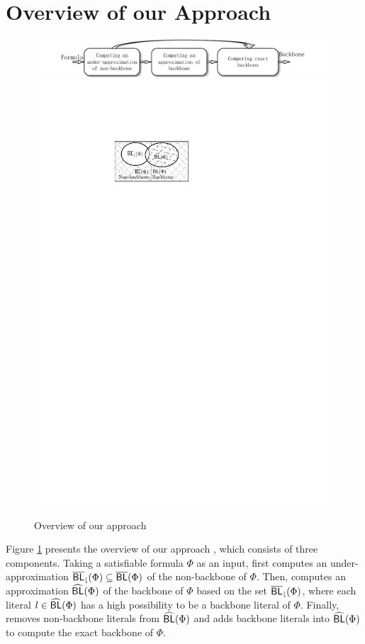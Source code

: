 \section{Overview of our Approach}\label{sec:walg}
\begin{figure}[t]
   \includegraphics[scale=0.75]{Framework}
  \hspace*{50mm} \includegraphics[scale=0.75]{Fig-backbone}
   \caption{Overview of our approach}
   \label{flow}
\end{figure}

Figure \ref{flow} presents the overview of our approach \tool, which consists of three components. Taking a satisfiable formula
$\Phi$ as an input, \tool first computes an under-approximation ${\sf \overline{BL}_\downharpoonright}(\Phi)\subseteq \overline{\textsf{BL}}(\Phi)$ of the non-backbone of
$\Phi$. Then, \tool computes an approximation ${\sf \widehat{BL}}(\Phi)$ of the backbone of $\Phi$ based on the set ${\sf \overline{BL}_\downharpoonright}(\Phi)$, where each literal $l\in {\sf \widehat{BL}}(\Phi)$ has a high possibility to be a backbone literal of $\Phi$.
Finally, \tool removes non-backbone literals from ${\sf \widehat{BL}}(\Phi)$ and adds backbone literals into ${\sf \widehat{BL}}(\Phi)$ to compute the exact backbone of $\Phi$.

